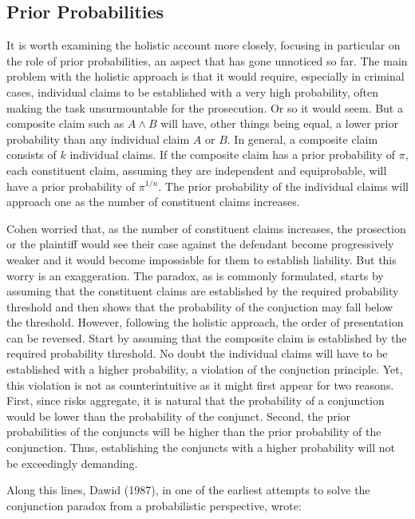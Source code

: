 \documentclass[10pt,dvipsnames,enabledeprecatedfontcommands]{scrartcl}
\begin{document}
\hypertarget{prior-probabilities}{%
\subsection{Prior Probabilities}\label{prior-probabilities}}

It is worth examining the holistic account more closely, focusing in
particular on the role of prior probabilities, an aspect that has gone
unnoticed so far. The main problem with the holistic approach is that it
would require, especially in criminal cases, individual claims to be
established with a very high probability, often making the task
unsurmountable for the prosecution. Or so it would seem. But a composite
claim such as \(A\wedge B\) will have, other things being equal, a lower
prior probability than any individual claim \(A\) or \(B\). In general,
a composite claim consists of \(k\) individual claims. If the composite
claim has a prior probability of \(\pi\), each constituent claim,
assuming they are independent and equiprobable, will have a prior
probability of \(\pi^{1/n}\). The prior probability of the individual
claims will approach one as the number of constituent claims increases.

Cohen worried that, as the number of constituent claims increases, the
prosection or the plaintiff would see their case against the defendant
become progressively weaker and it would become impossisble for them to
establish liability. But this worry is an exaggeration. The paradox, as
is commonly formulated, starts by assuming that the constituent claims
are established by the required probability threshold and then shows
that the probability of the conjuction may fall below the threshold.
However, following the holistic approach, the order of presentation can
be reversed. Start by assuming that the composite claim is established
by the required probability threshold. No doubt the individual claims
will have to be established with a higher probability, a violation of
the conjuction principle. Yet, this violation is not as counterintuitive
as it might first appear for two reasons. First, since risks aggregate,
it is natural that the probability of a conjunction would be lower than
the probability of the conjunct. Second, the prior probabilities of the
conjuncts will be higher than the prior probability of the conjunction.
Thus, establishing the conjuncts with a higher probability will not be
exceedingly demanding.

Along this lines, Dawid (1987), in one of the earliest attempts to solve
the conjunction paradox from a probabilistic perspective, wrote:
\end{document}
